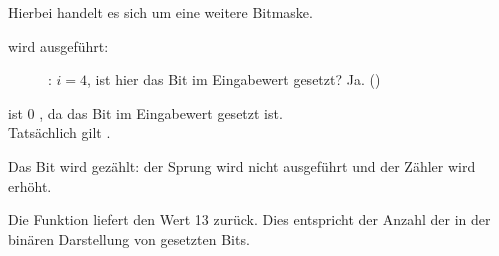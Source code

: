 Hierbei handelt es sich um eine weitere Bitmaske.

\clearpage
\AND wird ausgeführt:

\begin{figure}[H]
\centering
{}
\caption{\olly: $i=4$, 
ist hier das Bit im Eingabewert gesetzt? Ja. ()}
\label{fig:shifts_olly4_3}
\end{figure}

\ZF ist 0 , da das Bit im Eingabewert gesetzt ist.\\
Tatsächlich gilt . 

Das Bit wird gezählt: der Sprung wird nicht ausgeführt und der Zähler wird
erhöht.

Die Funktion liefert den Wert 13 zurück.
Dies entspricht der Anzahl der in der binären Darstellung von 
gesetzten Bits.

